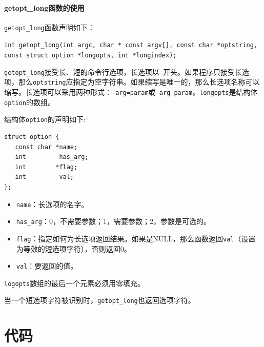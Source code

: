 \documentclass[lang=cn,11pt,a4paper,cite=authornum]{paper}
\begin{document}
\paragraph{getopt\_long函数的使用}

\texttt{getopt_long}函数声明如下：

\texttt{int getopt_long(int argc, char * const argv[], const char *optstring, const struct option *longopts, int *longindex);}

\texttt{getopt_long}接受长、短的命令行选项，长选项以\texttt{--}开头。如果程序只接受长选项，那么\texttt{optstring}应指定为空字符串。如果缩写是唯一的，那么长选项名称可以缩写。长选项可以采用两种形式：\texttt{--arg=param}或\texttt{--arg param}。\texttt{longopts}是结构体\texttt{option}的数组。

结构体\texttt{option}的声明如下:

\begin{code}
    \begin{verbatim}
struct option {
   const char *name;
   int         has_arg;
   int        *flag;
   int         val;
};
\end{verbatim}
\end{code}

\begin{itemize}
    \item \texttt{name}：长选项的名字。
    \item \texttt{has_arg}：0，不需要参数；1，需要参数；2，参数是可选的。
    \item \texttt{flag}：指定如何为长选项返回结果。如果是NULL，那么函数返回\texttt{val}（设置为等效的短选项字符），否则返回0。
    \item \texttt{val}：要返回的值。
\end{itemize}

\texttt{logopts}数组的最后一个元素必须用零填充。

当一个短选项字符被识别时，\texttt{getopt_long}也返回选项字符。

\section{代码}
\end{document}
